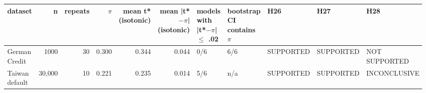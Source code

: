 \begin{tabular}{lrrrrrlllll}
\toprule
dataset & n & repeats & $\pi$ & mean t* (isotonic) & mean |t*$-$$\pi$| (isotonic) & models with |t*$-$$\pi$| $\leq$ .02 & bootstrap CI contains $\pi$ & H26 & H27 & H28 \\
\midrule
German Credit & 1000 & 30 & 0.300 & 0.344 & 0.044 & 0/6 & 6/6 & SUPPORTED & SUPPORTED & NOT SUPPORTED \\
Taiwan default & 30,000 & 10 & 0.221 & 0.235 & 0.014 & 5/6 & n/a & SUPPORTED & SUPPORTED & INCONCLUSIVE \\
\bottomrule
\end{tabular}
